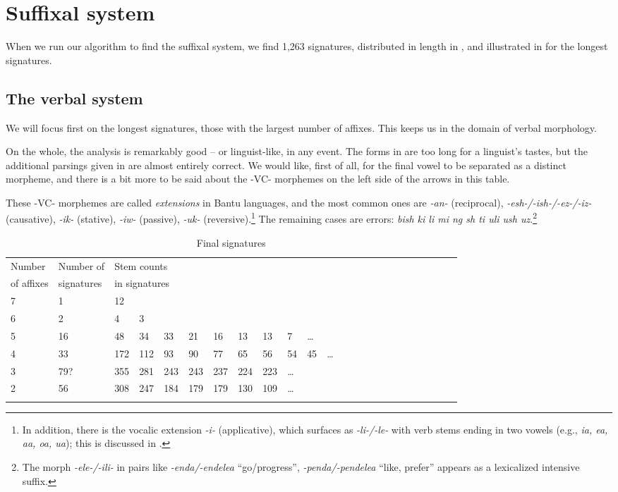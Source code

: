 \documentclass[output=paper,colorlinks,citecolor=brown]{langscibook}
\begin{document}
\section{Suffixal system}

When we run our algorithm to find the suffixal system, we find 1,263 signatures, distributed in length in , and illustrated in  for the longest signatures.

\subsection{The verbal system}

We will focus first on the longest signatures, those with the largest number of affixes. This keeps us in the domain of verbal morphology.

On the whole, the analysis is remarkably good -- or linguist-like, in any event. The forms in  are too long for a linguist's tastes, but the additional parsings given in  are almost entirely correct. We would like, first of all, for the final vowel to be separated as a distinct morpheme, and there is a bit more to be said about the -VC- morphemes on the left side of the arrows in this table.

These -VC- morphemes are called \textit{extensions} in Bantu languages, and the most common ones are \textit{-an-} (reciprocal), \textit{-esh-/-ish-/-ez-/-iz-} (causative), \textit{-ik-} (stative), \textit{-iw-} (passive), \textit{-uk-} (reversive).\footnote{In addition, there is the vocalic extension \textit{-i-} (applicative), which surfaces as \textit{-li-/-le-} with verb stems ending in two vowels (e.g., \textit{ia, ea, aa, oa, ua}); this is discussed in \cite[112, 146]{Mpiranya2014}.} The remaining cases are errors: \textit{bish ki li mi ng sh ti uli ush uz}.\footnote{The morph \textit{-ele-/-ili-} in pairs like \textit{-enda/-endelea} ``go/progress'', \textit{-penda/-pendelea} ``like, prefer'' appears as a lexicalized intensive suffix.} 



\begin{table}
\begin{tabular}{llllllllllllllllllllllll} \lsptoprule
Number  &  Number of  & \multicolumn{10}{l}{Stem counts } \\
 of affixes &   signatures & \multicolumn{10}{l}{in signatures} \\ \midrule
7 & 1 & 12  \\
6 & 2 & 4 & 3  \\
5 & 16 & 48 & 34 & 33 & 21 & 16 & 13 & 13 & 7 &    \ldots \\
4 & 33 & 172 & 112 & 93 & 90 & 77 & 65& 56 & 54 & 45& \ldots\\
3 &  79? & 355 & 281 & 243 & 243  & 237 & 224 & 223 &  \ldots\\
2 & 56 & 308 & 247 & 184 & 179 & 179 & 130 & 109 & \ldots \\ \lspbottomrule
\end{tabular}
\caption{Final signatures}
\label{final-sigs-1}
\end{table}
\end{document}
